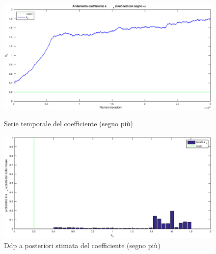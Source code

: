 \begin{figure}[ht]
\centering
\begin{minipage}[b]{0.45\linewidth}
\includegraphics[scale=0.15]{akhplus.eps}
\caption{Serie temporale del coefficiente (segno più)}
\label{fig:minipage1}
\end{minipage}
\quad
\begin{minipage}[b]{0.45\linewidth}
\includegraphics[scale=0.15]{p_ak_plus.eps}
\caption{Ddp a posteriori stimata del coefficiente (segno più)}
\label{fig:minipage2}
\end{minipage}
\end{figure}
